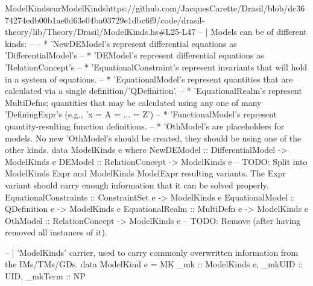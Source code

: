 \begin{haskell}{ModelKinds}{curModelKinds}{https://github.com/JacquesCarette/Drasil/blob/dc3674274edb00b1ae0d63e04ba03729e1dbc6f9/code/drasil-theory/lib/Theory/Drasil/ModelKinds.hs\#L25-L47}
-- | Models can be of different kinds: 
--
--     * 'NewDEModel's represent differential equations as 'DifferentialModel's
--     * 'DEModel's represent differential equations as 'RelationConcept's
--     * 'EquationalConstraint's represent invariants that will hold in a system of equations.
--     * 'EquationalModel's represent quantities that are calculated via a single definition/'QDefinition'.
--     * 'EquationalRealm's represent MultiDefns; quantities that may be calculated using any one of many 'DefiningExpr's (e.g., 'x = A = ... = Z')
--     * 'FunctionalModel's represent quantity-resulting function definitions.
--     * 'OthModel's are placeholders for models. No new 'OthModel's should be created, they should be using one of the other kinds.
data ModelKinds e where
  NewDEModel            :: DifferentialModel -> ModelKinds e
  DEModel               :: RelationConcept   -> ModelKinds e -- TODO: Split into ModelKinds Expr and ModelKinds ModelExpr resulting variants. The Expr variant should carry enough information that it can be solved properly.
  EquationalConstraints :: ConstraintSet e   -> ModelKinds e
  EquationalModel       :: QDefinition e     -> ModelKinds e
  EquationalRealm       :: MultiDefn e       -> ModelKinds e
  OthModel              :: RelationConcept   -> ModelKinds e -- TODO: Remove (after having removed all instances of it).


-- | 'ModelKinds' carrier, used to carry commonly overwritten information from the IMs/TMs/GDs.
data ModelKind e = MK {
  _mk     :: ModelKinds e,
  _mkUID  :: UID,
  _mkTerm :: NP
}
\end{haskell}
